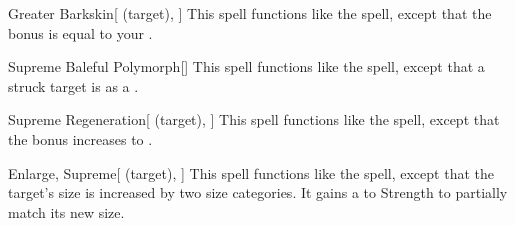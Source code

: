\lowercase{\hypertarget{spell:Greater Barkskin}{}}\label{spell:Greater Barkskin}
\begin{attuneability}[Rank 7]{\hypertarget{spell:Greater Barkskin}{Greater Barkskin}}[ (target), ]
This spell functions like the  spell, except that the bonus is equal to your .
\end{attuneability}
\vspace{0.25em}



\lowercase{\hypertarget{spell:Supreme Baleful Polymorph}{}}\label{spell:Supreme Baleful Polymorph}
\begin{freeability}[Rank 7]{\hypertarget{spell:Supreme Baleful Polymorph}{Supreme Baleful Polymorph}}[]
This spell functions like the  spell, except that a struck target is  as a .
\end{freeability}
\vspace{0.25em}



\lowercase{\hypertarget{spell:Supreme Regeneration}{}}\label{spell:Supreme Regeneration}
\begin{attuneability}[Rank 7]{\hypertarget{spell:Supreme Regeneration}{Supreme Regeneration}}[ (target), ]
This spell functions like the  spell, except that the bonus increases to .
\end{attuneability}
\vspace{0.25em}



\lowercase{\hypertarget{spell:Enlarge, Supreme}{}}\label{spell:Enlarge, Supreme}
\begin{attuneability}[Rank 8]{\hypertarget{spell:Enlarge, Supreme}{Enlarge, Supreme}}[ (target), ]
This spell functions like the  spell, except that the target's size is increased by two size categories.
It gains a   to Strength to partially match its new size.
\end{attuneability}
\vspace{0.25em}



